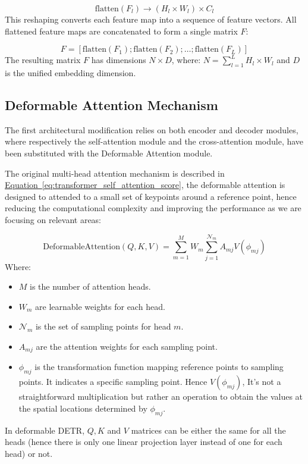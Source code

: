 \documentclass[12pt]{article}
\begin{document}
\begin{equation}
    \text{flatten}(F_l) \rightarrow (H_l \times W_l) \times C_l    
\end{equation}
This reshaping converts each feature map into a sequence of feature vectors. 
All flattened feature maps are concatenated to form a single matrix $F$:

\begin{equation}
    F = [\text{flatten}(F_1); \text{flatten}(F_2); \ldots; \text{flatten}(F_L)]    
\end{equation}
The resulting matrix $F$ has dimensions $N \times D$, where:
$N = \sum_{l=1}^{L} H_l \times W_l$ and $D$ is the unified embedding dimension.

\subsection{Deformable Attention Mechanism}
The first architectural modification relies on both encoder and decoder modules, where respectively
the self-attention module and the cross-attention module, have been substituted with the Deformable 
Attention module.

The original multi-head attention mechanism is described in 
\hyperref[eq:transformer_self_attention_score]{Equation~\ref*{eq:transformer_self_attention_score}}, 
the deformable attention is designed to attended to a small set of keypoints around a reference point, 
hence reducing the computational complexity and improving the performance as we are focusing on relevant 
areas:

\begin{equation}
    \text{DeformableAttention}(Q, K, V) = \sum_{m=1}^{M} W_m \sum_{j=1}^{\mathcal{N}_m} A_{mj} V(\phi_{mj})
\end{equation}
Where:
\begin{itemize}
    \item $M$ is the number of attention heads.
    \item $W_m$ are learnable weights for each head.
    \item $\mathcal{N}_m$ is the set of sampling points for head $m $.
    \item $A_{mj}$ are the attention weights for each sampling point.
    \item $\phi_{mj}$ is the transformation function mapping reference points to sampling points.
    It indicates a specific sampling point. Hence $V(\phi_{mj})$, It's not a straightforward 
    multiplication but rather an operation to obtain the values at the spatial locations determined by
    $\phi_{mj}$.
\end{itemize}
In deformable DETR, $Q,K$ and $V$ matrices can be either the same for all the heads (hence there is only 
one linear projection layer instead of one for each head) or not. 
\end{document}
